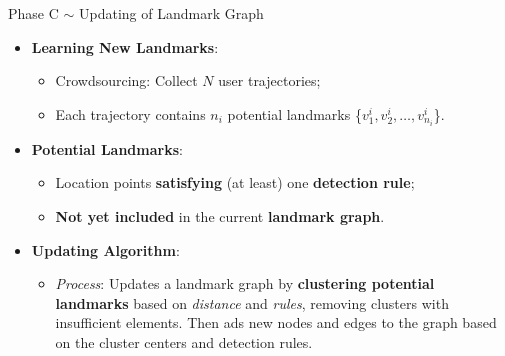 \begin{frame}{Phase C $\sim$ Updating of Landmark Graph}
    \begin{itemize}
     
      \item \textbf{Learning New Landmarks}:
        \begin{itemize}
          \item Crowdsourcing: Collect $N$ user trajectories;
          \item Each trajectory contains $n_i$ potential landmarks \{$v_1^i, v_2^i, \dots, v_{n_i}^i$\}.
        \end{itemize}
      \item \textbf{Potential Landmarks}:
        \begin{itemize}
          \item Location points \textbf{satisfying} (at least) one \textbf{detection rule};
          \item \textbf{Not yet included} in the current \textbf{landmark graph}.
        \end{itemize}
      \item \textbf{Updating Algorithm}:
        \begin{itemize}
          \item \textit{Process}: Updates a landmark graph by \textbf{clustering potential landmarks} based on \textit{distance} and \textit{rules}, removing clusters with insufficient elements. Then ads new nodes and edges to the graph based on the cluster centers and detection rules.
        \end{itemize}
    \end{itemize}
\end{frame}